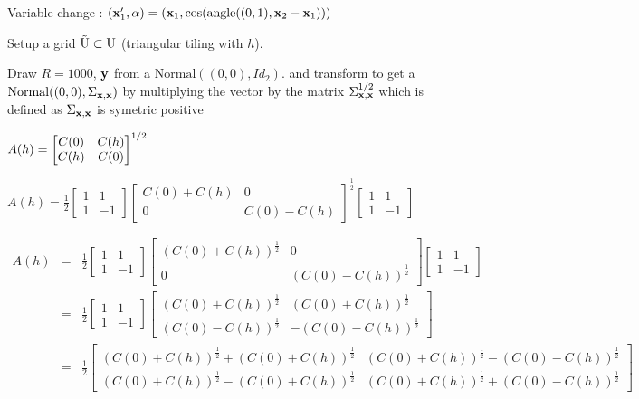 Variable change : $(\mathbf{x}'_1,\alpha)=
(\mathbf{x}_1,\cos(\mathrm{angle}((0,1),\mathbf{x}_2-\mathbf{x}_1)))$


Setup a grid $\tilde{\mathrm{U}}\subset\mathrm{U}$
(triangular tiling with $h$).

Draw $R=1000$, $\mathbf{y}$ from a $\mathrm{Normal}((0,0),Id_2)$.
and transform to get a 
$\mathrm{Normal}((0,0),\Sigma_{\mathbf{x},\mathbf{x}})$
by multiplying the vector by the matrix $\Sigma_{\mathbf{x},\mathbf{x}}^{1/2}$ which is defined as 
$\Sigma_{\mathbf{x},\mathbf{x}}$ is symetric positive



$A(h)=\begin{bmatrix}C(0)&C(h)\\C(h)&C(0)\end{bmatrix}^{1/2}$

$A(h)=\frac12\begin{bmatrix}1&1\\1&-1\end{bmatrix}\begin{bmatrix}C(0)+C(h)&0\\0&C(0)-C(h)\end{bmatrix}^{\frac12}\begin{bmatrix}1&1\\1&-1\end{bmatrix}$

\begin{eqnarray*}
A(h)&=&\frac12\begin{bmatrix}1&1\\1&-1\end{bmatrix}\begin{bmatrix}(C(0)+C(h))^{\frac12}&0\\0&(C(0)-C(h))^{\frac12}\end{bmatrix}\begin{bmatrix}1&1\\1&-1\end{bmatrix}\\
&=&\frac12\begin{bmatrix}1&1\\1&-1\end{bmatrix}\begin{bmatrix}(C(0)+C(h))^{\frac12}&(C(0)+C(h))^{\frac12}\\(C(0)-C(h))^{\frac12}&-(C(0)-C(h))^{\frac12}\end{bmatrix}\\
&=&\frac12\begin{bmatrix}(C(0)+C(h))^{\frac12}+
                         (C(0)+C(h))^{\frac12}
                        &(C(0)+C(h))^{\frac12}-
                         (C(0)-C(h))^{\frac12}\\
                         (C(0)+C(h))^{\frac12}-
                         (C(0)+C(h))^{\frac12}
                        &(C(0)+C(h))^{\frac12}+
                         (C(0)-C(h))^{\frac12}\end{bmatrix}
\end{eqnarray*}

